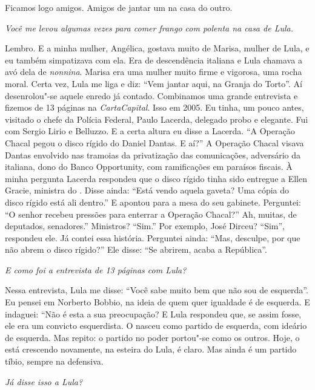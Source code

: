 \normalfont
Ficamos logo amigos. Amigos de jantar um na casa do
outro.

\itshape
 Você me levou algumas vezes para comer frango com
polenta na casa de Lula.

\normalfont
Lembro. E a minha mulher, Angélica, gostava muito de
Marisa, mulher de Lula, e eu também simpatizava com ela. Era de
descendência italiana e Lula chamava a avó dela de \emph{nonnina}.
Marisa era uma mulher muito firme e vigorosa, uma rocha moral. Certa
vez, Lula me liga e diz: ``Vem jantar aqui, na Granja do Torto''. Aí
desenrolou"-se aquele enredo já contado. Combinamos uma grande entrevista
e fizemos de 13 páginas na \emph{CartaCapital}. Isso em 2005. Eu tinha,
um pouco antes, visitado o chefe da Polícia Federal, Paulo Lacerda,
delegado probo e elegante. Fui com Sergio Lirio e Belluzzo. E a certa
altura eu disse a Lacerda. ``A Operação Chacal pegou o disco rígido do
Daniel Dantas. E aí?'' A Operação Chacal visava Dantas envolvido nas
tramoias da privatização das comunicações, adversário da  italiana,
dono do Banco Opportunity, com ramificações em paraísos fiscais. À minha
pergunta Lacerda respondeu que o disco rígido tinha sido entregue a
Ellen Gracie, ministra do . Disse ainda: ``Está vendo aquela gaveta?
Uma cópia do disco rígido está ali dentro.'' E apontou para a mesa do
seu gabinete. Perguntei: ``O senhor recebeu pressões para enterrar a
Operação Chacal?'' Ah, muitas, de deputados, senadores.'' Ministros?
``Sim.'' Por exemplo, José Dirceu? ``Sim'', respondeu ele. Já contei
essa história. Perguntei ainda: ``Mas, desculpe, por que não abrem o
disco rígido?'' Ele disse: ``Se abrirem, acaba a República''.

\itshape
 E como foi a entrevista de 13 páginas com Lula?

\normalfont
Nessa entrevista, Lula me disse: ``Você sabe muito bem
que não sou de esquerda''. Eu pensei em Norberto Bobbio, na ideia de
quem quer igualdade é de esquerda. E indaguei: ``Não é esta a sua
preocupação? E Lula respondeu que, se assim fosse, ele era um convicto
esquerdista. O  nasceu como partido de esquerda, com ideário de
esquerda. Mas repito: o partido no poder portou"-se como os outros. Hoje,
o  está crescendo novamente, na esteira do Lula, é claro. Mas ainda é
um partido tíbio, sempre na defensiva.

\itshape
 Já disse isso a Lula?


